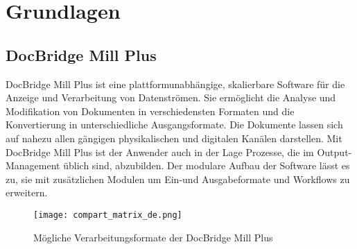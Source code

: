 
\chapter{Grundlagen}
\label{cha:Grundlagen}

\section{DocBridge Mill Plus}{
\label{sec:MillPlus}
DocBridge Mill Plus ist eine plattformunabhängige, skalierbare Software für die Anzeige und Verarbeitung von Datenströmen. Sie ermöglicht die Analyse und Modifikation von Dokumenten in verschiedensten Formaten und die Konvertierung in unterschiedliche Ausgangsformate. Die Dokumente lassen sich auf nahezu allen gängigen physikalischen und digitalen Kanälen darstellen. Mit DocBridge Mill Plus ist der Anwender auch in der Lage Prozesse, die im Output-Management üblich sind, abzubilden. Der modulare Aufbau der Software lässt es zu, sie mit zusätzlichen Modulen um Ein-und Ausgabeformate und Workflows zu erweitern.

\begin{figure}[htbp] 
  \centering
     \texttt{[image: compart\_matrix\_de.png]}
  \caption{Mögliche Verarbeitungsformate der DocBridge Mill Plus}
  \label{fig:compart_matrix}
\end{figure}

\newpage

}

